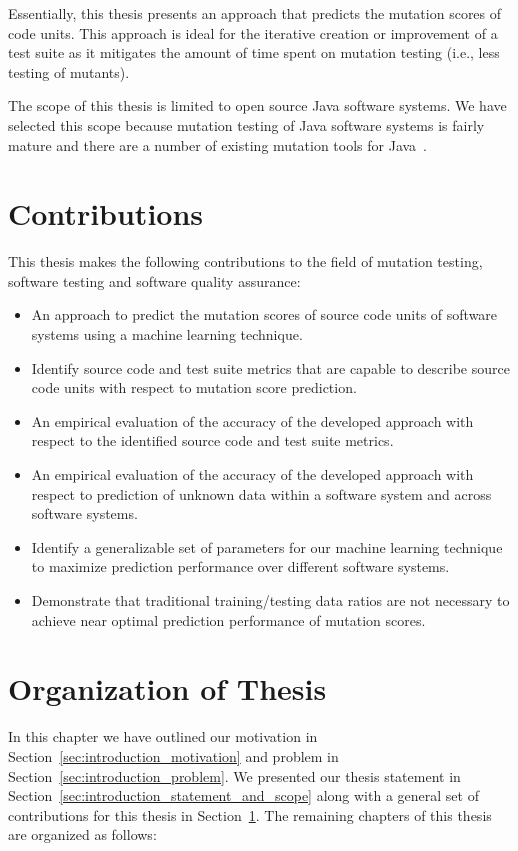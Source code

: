 Essentially, this thesis presents an approach that predicts the mutation scores of code units. This approach is ideal for the iterative creation or improvement of a test suite as it mitigates the amount of time spent on mutation testing (i.e., less testing of mutants).

The scope of this thesis is limited to open source Java software systems. We have selected this scope because mutation testing of Java software systems is fairly mature and there are a number of existing mutation tools for Java~\cite{JH10}.


\section{Contributions}
\label{sec:introduction_contributions}
This thesis makes the following contributions to the field of mutation testing, software testing and software quality assurance:

\begin{itemize}
  \item An approach to predict the mutation scores of source code units of software systems using a machine learning technique.
  \item Identify source code and test suite metrics that are capable to describe source code units with respect to mutation score prediction.
  \item An empirical evaluation of the accuracy of the developed approach with respect to the identified source code and test suite metrics.
  \item An empirical evaluation of the accuracy of the developed approach with respect to prediction of unknown data within a software system and across software systems.
  \item Identify a generalizable set of parameters for our machine learning technique to maximize prediction performance over different software systems.
  \item Demonstrate that traditional training/testing data ratios are not necessary to achieve near optimal prediction performance of mutation scores.
\end{itemize}


\section{Organization of Thesis}
\label{sec:introduction_organization}
In this chapter we have outlined our motivation in Section~\ref{sec:introduction_motivation} and problem in Section~\ref{sec:introduction_problem}. We presented our thesis statement in Section~\ref{sec:introduction_statement_and_scope} along with a general set of contributions for this thesis in Section~\ref{sec:introduction_contributions}. The remaining chapters of this thesis are organized as follows:

